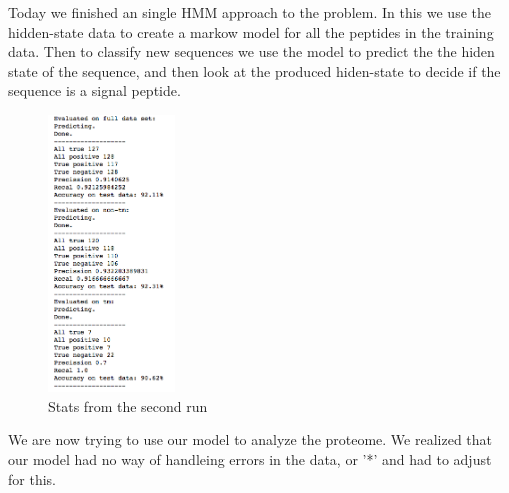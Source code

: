 \documentclass[a4paper]{tufte-handout}
\begin{document}

Today we finished an single HMM approach to the problem. In this we use the
hidden-state data to create a markow model for all the peptides in the training
data. Then to classify new sequences we use the model to predict the the hiden
state of the sequence, and then look at the produced hiden-state to decide if
the sequence is a signal peptide.

\begin{figure}
    \begin{center}
      \includegraphics[width=0.3\textwidth]{pics/second_hmm_run.png}
    \end{center}
    \caption{Stats from the second run}
\end{figure}


We are now trying to use our model to analyze the proteome. We realized that
our model had no way of handleing errors in the data, or '*' and had to adjust
for this. 

\hrulefill



\end{document}
